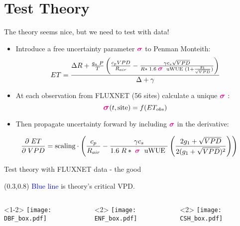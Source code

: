 \documentclass[aspectratio=169]{beamer}
\begin{document}
\section{Test Theory}
\begin{frame}{The theory seems nice, but we need to test with data!}
  \begin{itemize}
  \item Introduce a free uncertainty parameter \Large $\textcolor{magenta}{\boldsymbol{\sigma}}$ \normalsize to Penman Monteith:
    \[ET = \frac{\Delta R + \frac{g_a\; P}{T} \left( \frac{ c_p VPD}{R_{air}} -  \frac{\gamma c_s \sqrt{VPD} }{ R* \; 1.6\; \textcolor{magenta}{\boldsymbol{\mathlarger{\sigma}}} \; \text{ uWUE } (1 + \frac{g_1}{\sqrt{VPD}})} \right) }{ \Delta + \gamma}\]
  \item At each observation from FLUXNET (56 sites) calculate a unique \Large $\textcolor{magenta}{\boldsymbol{\sigma}}$ \normalsize:
    \[\textcolor{magenta}{\boldsymbol{\mathlarger{\sigma}}}(t, \text{site}) = f(ET_{obs})\]

  \item Then propagate uncertainty forward by including \Large $\textcolor{magenta}{\boldsymbol{\sigma}}$ \normalsize in the derivative:
  \end{itemize}
  \[\frac{\partial \;  ET}{\partial \; VPD} = \text{scaling} \cdot \left(\frac{ c_p}{R_{air}} -  \frac{\gamma c_s }{1.6 \; R*\; \textcolor{magenta}{\boldsymbol{\mathlarger{\sigma}}} \; \text{ uWUE }} \left( \frac{2 g_1 + \sqrt{VPD}}{2 (g_1 + \sqrt{VPD})^2}\right) \right)\]
\end{frame}

\begin{frame}{Test theory with FLUXNET data - the good}
    \begin{textblock*}{1.0\textwidth}(0.3\textwidth,0.8\textheight)
      \textcolor{blue}{Blue line} is theory's critical VPD.\\
  \end{textblock*}

  \begin{columns}
    \begin{column}{0.33\textwidth}<1-2>
      \texttt{[image: DBF\_box.pdf]}
    \end{column}
    \begin{column}{0.33\textwidth}<2>
      \texttt{[image: ENF\_box.pdf]}
    \end{column}
    \begin{column}{0.33\textwidth}<2>
      \texttt{[image: CSH\_box.pdf]}
    \end{column}
  \end{columns}
\end{frame}
\end{document}
